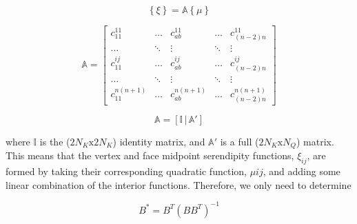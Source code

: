 \begin{equation}
\label{eq::BF_quad_to_ser_mapping}
\left\{ \xi \right\} = \mathbb{A} \left\{ \mu \right\}
\end{equation}

\begin{equation}
\label{eq::BF_quad_to_ser_matrix_constraints}
\mathbb{A} = 
\left[
\begin{array}{ccccc}
c_{11}^{11} & \ldots & c_{ab}^{11} & \ldots & c_{(n-2)n}^{11} \\
\ldots&\ddots&\vdots&\ddots&\vdots \\
c_{11}^{ij} & \ldots & c_{ab}^{ij} & \ldots & c_{(n-2)n}^{ij} \\
\ldots&\ddots&\vdots&\ddots&\vdots \\
c_{11}^{n(n+1)} & \ldots & c_{ab}^{n(n+1)} & \ldots & c_{(n-2)n}^{n(n+1)} 
\end{array}
\right]
\end{equation}


\begin{equation}
\label{eq::BF_quad_Amat_simple}
\mathbb{A} = \left[ \mathbb{I} \, | \, \mathbb{A}' \right]
\end{equation}

\noindent where $\mathbb{I}$ is the ($2 N_K \text{x} 2 N_K$) identity matrix, and $\mathbb{A}'$ is a full ($2 N_K \text{x}  N_Q$) matrix. This means that the vertex and face midpoint serendipity functions, $\xi_{ij}$, are formed by taking their corresponding quadratic function, $\mu{ij}$, and adding some linear combination of the interior functions. Therefore, we only need to determine 

\begin{equation}
\label{eq::BF_quad_MP_inverse}
B^* = B^T (B B^T)^{-1}
\end{equation}


